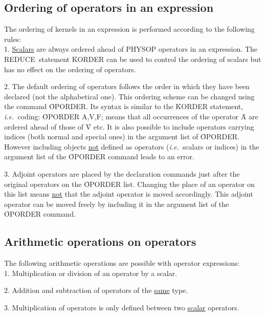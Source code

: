 \documentclass[11pt,letterpaper]{book}
\makeatletter
\newcommand{\REDUCE}{REDUCE}
\newcommand{\underscore}{\_}
\newcommand{\ttindex}[1]{{\renewcommand{\_}{\protect\underscore}%
                          \index{#1@{\tt #1}}}}
\makeatother
\begin{document}
\subsection{Ordering of operators in an expression}

The ordering of kernels in an expression is performed according to
the following rules: \\
1. \underline{Scalars} are always ordered ahead of
PHYSOP operators in an expression.
The \REDUCE\ statement \f{KORDER}\ttindex{KORDER} can be used to control the
ordering of scalars but has no
effect on the ordering of operators.

2. The default ordering of operators follows the
order in which they have been declared (not the alphabetical one).
This ordering scheme can be changed using the command \f{OPORDER}.
\ttindex{OPORDER}
Its syntax is similar to the \f{KORDER} statement, {\em i.e.\ }coding:
\f{OPORDER A,V,F;}
means that all occurrences of the operator \f{A} are ordered ahead of
those of \f{V} etc.  It is also possible to include operators
carrying
indices (both normal and special ones) in the argument list of
\f{OPORDER}. However including objects  \underline{not}
defined as operators ({\em i.e.\ }scalars or indices) in the argument list
of the \f{OPORDER} command leads to an error.

3. Adjoint operators are placed by the declaration commands just
after the original operators on the \f{OPORDER} list. Changing the
place of an operator on this list means \underline{not} that the
adjoint operator is moved accordingly. This adjoint operator can
be moved freely  by including it in the argument list of the
\f{OPORDER} command.

\subsection{Arithmetic operations on operators}

The following arithmetic operations are possible with
operator expressions: \\

1. Multiplication or division of an operator by a scalar.

2. Addition and subtraction of operators of the \underline{same}
type.

3. Multiplication of operators is only defined between two
\underline{scalar} operators.
\end{document}
